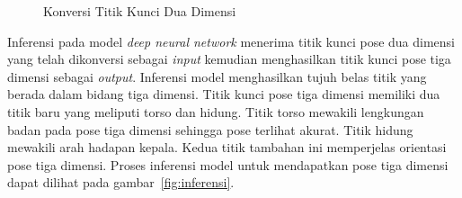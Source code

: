 \begin{figure}[htbp]
    \begin{center}
    \end{center}
    \vspace{-20pt}
    \captionsetup{labelfont=bf, textfont=bf}
    \caption{Konversi Titik Kunci Dua Dimensi}
    \vspace{-10pt}
    \captionsetup{labelfont=md, textfont=md}
    \label{fig:konversi}
\end{figure}


\pagebreak

Inferensi pada model \textit{deep neural network} menerima titik kunci pose dua dimensi yang telah
dikonversi sebagai \textit{input} kemudian menghasilkan titik kunci pose tiga dimensi sebagai \textit{output}.
Inferensi model menghasilkan tujuh belas titik yang berada dalam bidang tiga dimensi.
Titik kunci pose tiga dimensi memiliki dua titik baru yang meliputi torso dan hidung. Titik torso
mewakili lengkungan badan pada pose tiga dimensi sehingga pose terlihat akurat. Titik hidung
mewakili arah hadapan kepala. Kedua titik tambahan ini memperjelas orientasi pose tiga dimensi.
Proses inferensi model untuk mendapatkan pose tiga dimensi dapat
dilihat pada gambar~\ref{fig:inferensi}. %

